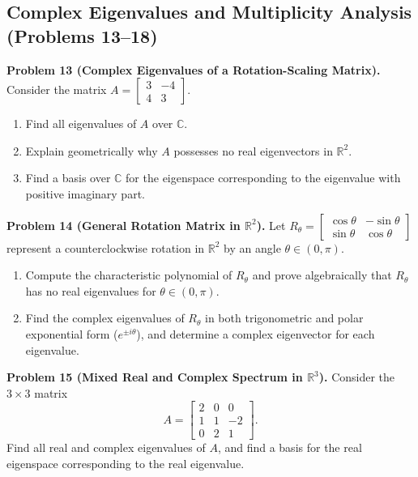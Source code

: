 \documentclass[11pt, letterpaper]{article}
\theoremstyle{definition}
\theoremstyle{remark}
\begin{document}
\subsection{Complex Eigenvalues and Multiplicity Analysis (Problems 13--18)}

\textbf{Problem 13 (Complex Eigenvalues of a Rotation-Scaling Matrix).}
Consider the matrix $A = \begin{bmatrix} 3 & -4 \\ 4 & 3 \end{bmatrix}$.
\begin{enumerate}[label=(\alph*)]
    \item Find all eigenvalues of $A$ over $\mathbb{C}$.
    \item Explain geometrically why $A$ possesses no real eigenvectors in $\mathbb{R}^2$.
    \item Find a basis over $\mathbb{C}$ for the eigenspace corresponding to the eigenvalue with positive imaginary part.
\end{enumerate}

\textbf{Problem 14 (General Rotation Matrix in $\mathbb{R}^2$).}
Let $R_\theta = \begin{bmatrix} \cos\theta & -\sin\theta \\ \sin\theta & \cos\theta \end{bmatrix}$ represent a counterclockwise rotation in $\mathbb{R}^2$ by an angle $\theta \in (0, \pi)$.
\begin{enumerate}[label=(\alph*)]
    \item Compute the characteristic polynomial of $R_\theta$ and prove algebraically that $R_\theta$ has no real eigenvalues for $\theta \in (0, \pi)$.
    \item Find the complex eigenvalues of $R_\theta$ in both trigonometric and polar exponential form ($e^{\pm i\theta}$), and determine a complex eigenvector for each eigenvalue.
\end{enumerate}

\textbf{Problem 15 (Mixed Real and Complex Spectrum in $\mathbb{R}^3$).}
Consider the $3 \times 3$ matrix
\[
A = \begin{bmatrix} 2 & 0 & 0 \\ 1 & 1 & -2 \\ 0 & 2 & 1 \end{bmatrix}.
\]
Find all real and complex eigenvalues of $A$, and find a basis for the real eigenspace corresponding to the real eigenvalue.
\end{document}
